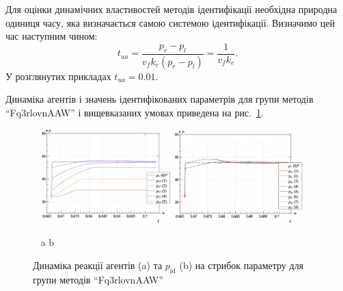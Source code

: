 \documentclass[a4paper,13pt]{atuaref}
\begin{document}
Для оцінки динамічних властивостей методів ідентифікації необхідна природна
одиниця часу, яка визначається самою системою ідентифікації.
Визначимо цей час  наступним чином:
%
\begin{equation}
  t_{ua} = \frac{p_r - p_l}{ v_f k_e (p_r - p_l)} = \frac{1}{v_f k_e}.
  \label{atu:eq:t_ua}
\end{equation}
%
У розглянутих прикладах $t_{ua} = 0.01$.

Динаміка агентів і значень ідентифікованих параметрів для групи методів
``Fq3rlovnAAW'' і вищевказаних умовах приведена на рис.~\ref{atu:f:Fq3rlovnAAW_sign}.

\begin{figure}[htb!]
  \centerline{
    ~ \hfill
    \includegraphics[width=0.45\textwidth]{p3/p/sign/qls-p_t_pi_m_Fq3rlovnAAW_sign_xl.png}
    \hfill
    \includegraphics[width=0.45\textwidth]{p3/p/sign/qls-p_t_p_m_Fq3rlovnAAW_sign_xl.png}
    \hfill ~
  }
  \vspace{-1.5ex}
  \begin{center}
    ~ \hfill a \hfill\hfill b  \hfill ~
  \end{center}
  \vspace{-2.5ex}
  \caption{Динаміка реакції агентів (a) та $p_\mathrm{id}$ (b) на стрибок параметру для групи методів ``Fq3rlovnAAW''}
  \label{atu:f:Fq3rlovnAAW_sign}
\end{figure}
\end{document}
